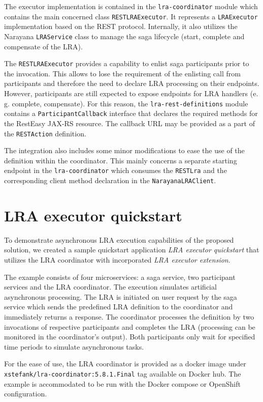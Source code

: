 \documentclass[oneside,
  digital, %
  table,   %
  lof,     %
  lot,     %
]{fithesis3}
\begin{document}
The executor implementation is contained in the \texttt{lra-coordinator} module which contains the main concerned class \texttt{RESTLRAExecutor}. It represents a \texttt{LRAExecutor} implementation based on the REST protocol. Internally, it also utilizes the Narayana \texttt{LRAService} class to manage the saga lifecycle (start, complete and compensate of the LRA).

The \texttt{RESTLRAExecutor} provides a capability to enlist saga participants prior to the invocation. This allows to lose the requirement of the enlisting call from participants and therefore the need to declare LRA processing on their endpoints. However, participants are still expected to expose endpoints for LRA handlers (e. g. complete, compensate). For this reason, the \texttt{lra-rest-definitions} module contains a \texttt{ParticipantCallback} interface that declares the required methods for the RestEasy JAX-RS resource. The callback URL may be provided as a part of the \texttt{RESTAction} definition.

The integration also includes some minor modifications to ease the use of the definition within the coordinator. This mainly concerns a separate starting endpoint in the \texttt{lra-coordinator} which consumes the \texttt{RESTLra} and the corresponding client method declaration in the \texttt{NarayanaLRAClient}.

\section{LRA executor quickstart}

To demonstrate asynchronous LRA execution capabilities of the proposed solution, we created a sample quickstart application \textit{LRA executor quickstart} that utilizes the LRA coordinator with incorporated \textit{LRA executor extension}. 

The example consists of four microservices: a saga service, two participant services and the LRA coordinator. The execution simulates artificial asynchronous processing. The LRA is initiated on user request by the saga service which sends the predefined LRA definition to the coordinator and immediately returns a response. The coordinator processes the definition by two invocations of respective participants and completes the LRA (processing can be monitored in the coordinator's output). Both participants only wait for specified time periods to simulate asynchronous tasks.

For the ease of use, the LRA coordinator is provided as a docker image under \texttt{xstefank/lra-coordinator:5.8.1.Final} tag available on Docker hub. The example is accommodated to be run with the Docker compose or OpenShift configuration.
\end{document}
